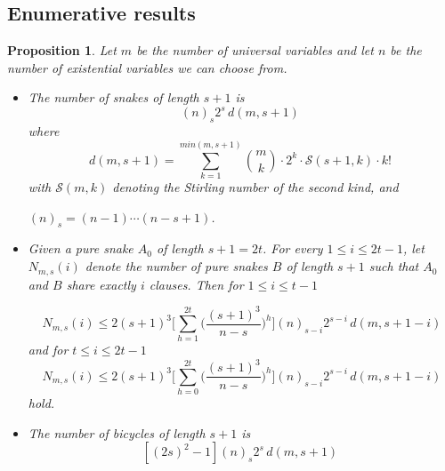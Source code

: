 \documentclass[aop,noinfoline]{imsart}
\newtheorem{proposition}[theorem]{Proposition}
\newcommand{\calS}{{\mathcal{S}}}
\begin{document}
\subsection{Enumerative results}\label{subsec:enum}

\begin{proposition}\label{prop:uppercertificatespure}
 Let $m$ be the number of universal variables and let $n$ be the number of existential variables we can choose from. 
  
   \begin{itemize} 
  \item The number of snakes of length $s+1$ is 
\begin{equation}\label{eqn:nbSnakes}
   (n)_s2^s\, d(m,s+1)\;
      \end{equation}
    where
  \begin{equation}\label{eqn:cms}
    d(m,s+1)=\sum_{k=1}^{min(m,s+1)} {m\choose k}\cdot 2^k\cdot \calS(s+1,k)
    \cdot k!\;
 \end{equation}
  with $\calS (m,k)$ denoting the Stirling number of the second kind,
  and 
  
  $(n)_s = (n-1)\cdots (n-s+1)$.

\item Given a pure snake $A_0$ of length $s+1=2t$. For every $1\leq i
  \leq 2t-1$,  let $N_{m,s}(i)$ denote the number  of pure snakes $B$ of
  length $s+1$ such that $A_0$ and $B$ share exactly  $i$ clauses.  Then for  $1\leq i \le t-1$ 

\begin{equation}\label{majo1N}  
N_{m,s}(i)\leq 2(s+1)^3 \Biggl [ \sum_{h=1}^{2t} \bigl ( \frac{ (s+1)^3}{n-s}\bigr )^h \Biggr ]  (n)_{s-i}2^{s-i}\, d(m,s+1-i)
\end{equation} and for  $t\leq i \leq 2t -1$
\begin{equation}\label{majo2N}
 N_{m,s}(i)\leq 2 (s+1)^3 \Biggl [ \sum_{h=0}^{2t} \bigl ( \frac{ (s+1)^3}{n-s}\bigr )^h \Biggr ] (n)_{s-i}2^{s-i}\, d(m,s+1-i)
\end{equation}
hold.

\item The number of bicycles of length $s+1$   is
\begin{equation}\label{eqn:nbBicycles}
   [(2s)^2 -1] (n)_s2^s\, d(m,s+1)\;
  \end{equation}
\end{itemize}

\end{proposition}
\end{document}
